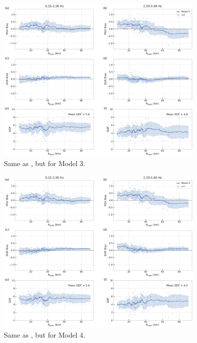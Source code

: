 \begin{figure}[!ht]
  \centering
  \includegraphics[width=0.9\textwidth,height=0.9\textheight,keepaspectratio]{figures/figure_highf_S13.pdf}
  \caption{Same as , but for Model 3.
  }
\label{fig:highf-S13}
\end{figure}
\clearpage


\begin{figure}[!ht]
  \centering
  \includegraphics[width=0.9\textwidth,height=0.9\textheight,keepaspectratio]{figures/figure_highf_S14.pdf}
  \caption{Same as , but for Model 4.
  }
\label{fig:highf-S14}
\end{figure}
\clearpage


